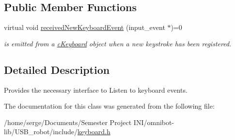\subsection*{Public Member Functions}
\begin{DoxyCompactItemize}
\item 
\hypertarget{class_keyboard_listener_ac9751e8976e26e8733ee6086b313c93d}{}virtual void \hyperlink{class_keyboard_listener_ac9751e8976e26e8733ee6086b313c93d}{received\+New\+Keyboard\+Event} (input\+\_\+event $\ast$)=0\label{class_keyboard_listener_ac9751e8976e26e8733ee6086b313c93d}

\begin{DoxyCompactList}\small\item\em is emitted from a \hyperlink{classc_keyboard}{c\+Keyboard} object when a new keystroke has been registered. \end{DoxyCompactList}\end{DoxyCompactItemize}


\subsection{Detailed Description}
Provides the necessary interface to Listen to keyboard events. 

The documentation for this class was generated from the following file\+:\begin{DoxyCompactItemize}
\item 
/home/serge/\+Documents/\+Semester Project I\+N\+I/omnibot-\/lib/\+U\+S\+B\+\_\+robot/include/\hyperlink{keyboard_8h}{keyboard.\+h}\end{DoxyCompactItemize}
